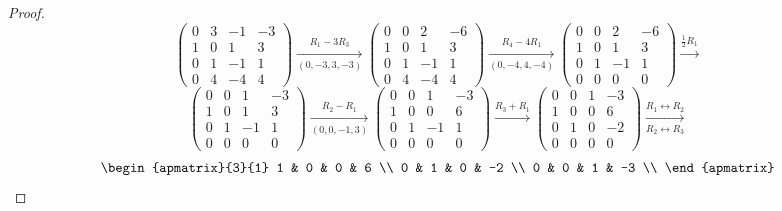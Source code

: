 \documentclass{article}
\begin{document}
\begin{proof}
\[\begin{pmatrix}
            0 & 3 & -1 & -3 \\
            1 & 0 & 1  & 3  \\
            0 & 1 & -1 & 1  \\
            0 & 4 & -4 & 4
        \end{pmatrix} \xrightarrow[(0,-3,3,-3)]{R_1 - 3R_3}
        \begin{pmatrix}
            0 & 0 & 2  & -6 \\
            1 & 0 & 1  & 3  \\
            0 & 1 & -1 & 1  \\
            0 & 4 & -4 & 4
        \end{pmatrix} \xrightarrow[(0,-4,4,-4)]{R_4 - 4R_1}
        \begin{pmatrix}
            0 & 0 & 2  & -6 \\
            1 & 0 & 1  & 3  \\
            0 & 1 & -1 & 1  \\
            0 & 0 & 0  & 0
        \end{pmatrix} \xrightarrow{\frac{1}{2}R_1}
    \]
    \[
        \begin{pmatrix}
            0 & 0 & 1  & -3 \\
            1 & 0 & 1  & 3  \\
            0 & 1 & -1 & 1  \\
            0 & 0 & 0  & 0
        \end{pmatrix} \xrightarrow[(0,0,-1,3)]{R_2 - R_1}
        \begin{pmatrix}
            0 & 0 & 1  & -3 \\
            1 & 0 & 0  & 6  \\
            0 & 1 & -1 & 1  \\
            0 & 0 & 0  & 0
        \end{pmatrix} \xrightarrow{R_3 + R_1}
        \begin{pmatrix}
            0 & 0 & 1 & -3 \\
            1 & 0 & 0 & 6  \\
            0 & 1 & 0 & -2 \\
            0 & 0 & 0 & 0
        \end{pmatrix} \xrightarrow[R_2 \leftrightarrow R_3]{R_1 \leftrightarrow R_2}
    \]
    \[
        \begin{apmatrix}{3}{1}
            1 & 0 & 0 & 6  \\
            0 & 1 & 0 & -2 \\
            0 & 0 & 1 & -3 \\

\end{apmatrix}\]
\end{proof}
\end{document}
